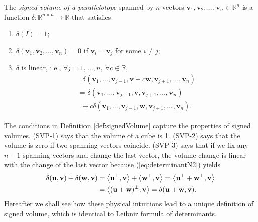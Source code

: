 \begin{defn}
  \label{def:signedVolume}
  The \emph{signed volume of a parallelotope}
  spanned by $n$ vectors
  $\mathbf{v}_1, \mathbf{v}_{2},\ldots, \mathbf{v}_n\in \mathbb{R}^n$
  is a function $\delta: \mathbb{R}^{n\times n} \rightarrow \mathbb{R}$
  that satisfies
  \begin{enumerate}[(SVP-1)]
  \item $\delta(I) = 1$;
  \item $\delta(\mathbf{v}_1, \mathbf{v}_2, \ldots, \mathbf{v}_n)=0$
    if $\mathbf{v}_i=\mathbf{v}_j$ for some $i\ne j$;
  \item $\delta$ is linear, i.e.,
    $\forall j=1,\ldots,n,\ \forall c\in \mathbb{R}$,
    \begin{equation}
      \label{eq:linearityOfSignedVolumn}
      \begin{array}{l}
        \ \ \ \delta(\mathbf{v}_1, \ldots,
          \mathbf{v}_{j-1}, \mathbf{v}+ c\mathbf{w}, \mathbf{v}_{j+1},
          \ldots, \mathbf{v}_n)
        \\
        = \delta(\mathbf{v}_1, \ldots,
            \mathbf{v}_{j-1}, \mathbf{v}, \mathbf{v}_{j+1},
            \ldots, \mathbf{v}_n)
        \\
        \ \ + 
      c\delta(\mathbf{v}_1, \ldots,
      \mathbf{v}_{j-1}, \mathbf{w}, \mathbf{v}_{j+1},
      \ldots, \mathbf{v}_n).
      \end{array}
    \end{equation}
  \end{enumerate}
\end{defn}

\begin{rem}
  The conditions in Definition \ref{def:signedVolume} capture
  the properties of signed volumes.
  (SVP-1) says that the volume of a cube is 1.
  (SVP-2) says that the volume is zero
  if two spanning vectors coincide.
  (SVP-3) says that if we fix any $n-1$ spanning vectors
  and change the last vector,
  the volume change is linear with the change of the last vector
  because (\ref{eq:determinantN2}) yields
  \begin{align*}
    \delta(\mathbf{u}, \mathbf{v})
    + \delta(\mathbf{w}, \mathbf{v})
    &= \left\langle \mathbf{u}^{\perp}, \mathbf{v} \right\rangle
      + \left\langle \mathbf{w}^{\perp}, \mathbf{v} \right\rangle
      = \left\langle \mathbf{u}^{\perp}+ {\mathbf{w}}^{\perp}, \mathbf{v} \right\rangle
      \\
    & = \left\langle (\mathbf{u}+\mathbf{w})^{\perp}, \mathbf{v} \right\rangle
      = \delta(\mathbf{u}+\mathbf{w}, \mathbf{v}).
  \end{align*}
  Hereafter we shall see how these physical intuitions
  lead to a unique definition of signed volume,
  which is identical to Leibniz formula of determinants.  
\end{rem}

